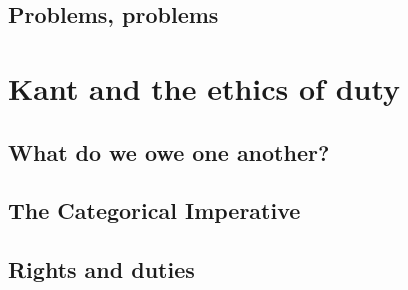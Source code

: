 \documentclass[]{book}
\begin{document}
\hypertarget{problems-problems}{%
\section{Problems, problems}\label{problems-problems}}

\hypertarget{kant-and-the-ethics-of-duty}{%
\chapter{Kant and the ethics of duty}\label{kant-and-the-ethics-of-duty}}

\hypertarget{what-do-we-owe-one-another}{%
\section{What do we owe one another?}\label{what-do-we-owe-one-another}}

\hypertarget{the-categorical-imperative}{%
\section{The Categorical Imperative}\label{the-categorical-imperative}}

\hypertarget{rights-and-duties}{%
\section{Rights and duties}\label{rights-and-duties}}


\end{document}
